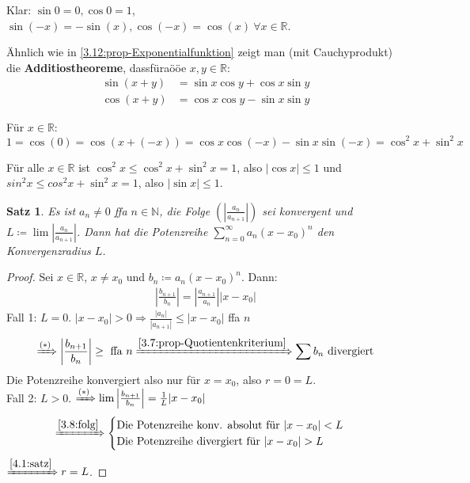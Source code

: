 \documentclass[12pt]{extreport} %
\newcommand{\N}{\mathbb{N}}
\newcommand{\R}{\mathbb{R}}
\theoremstyle{named}
\theoremstyle{dotless}
\newtheorem{satz}[unnamedtheorem]{Satz}
\begin{document}
Klar: $\sin 0 = 0, \cos 0 = 1$, $\sin (-x) = - \sin(x), \cos(-x) = \cos(x) ~\forall x \in \R$.

Ähnlich wie in \ref{3.12:prop-Exponentialfunktion} zeigt man (mit Cauchyprodukt) die \textbf{Additiostheoreme}, dassfüraööe $x, y \in \R$:
\begin{align*}
	\sin(x+y) & = \sin x \cos y + \cos x \sin y \\
	\cos(x+y) & = \cos x \cos y - \sin x \sin y
\end{align*}

Für $x \in \R$:
	$$ 1 = \cos(0) = \cos( x + (-x) )= \cos x \cos(-x) - \sin x \sin(-x) = \cos^{2} x + \sin^{2} x $$

Für alle $x \in \R$ ist $\cos^{2} x \leq \cos^{2} x + \sin^{2} x = 1$, also $|\cos x | \leq 1$ und $sin^{2} x \leq cos^{2} x + \sin^{2} x = 1$, also $|\sin x | \leq 1$.


\begin{satz} \label{4.4:satz}
	Es ist $a_{n} \neq 0$ ffa $n \in \N$, die Folge $\left( \left| \frac{a_{n}}{a_{n+1}} \right| \right)$ sei konvergent und $L \coloneqq \lim \left| \frac{a_{n}}{a_{n+1}} \right|$. Dann hat die Potenzreihe $\sum_{n=0}^{\infty} a_{n} (x - x_{0})^{n}$ den Konvergenzradius $L$.
\end{satz}

\begin{proof}
	Sei $x \in \R$, $x \neq x_{0}$ und $b_{n} \coloneqq a_{n} (x - x_{0})^{n}$. Dann:
	\begin{align}
		 \left| \frac{b_{n+1}}{b_{n}} \right| = \left| \frac{a_{n+1}}{a_{n}} \right| |x - x_{0}| \tag{$*$}
	\end{align}
	Fall 1: $L = 0$. $|x - x_{0}| > 0 \Rightarrow \frac{|a_{n}|}{|a_{n+1}|} \leq | x - x_{0}|$ ffa $n$
	$$ \xRightarrow[]{(*)} \left| \frac{b_{n+1}}{b_{n}} \right| \geq \text{ ffa } n \xRightarrow[]{\ref{3.7:prop-Quotientenkriterium}} \sum b_{n} \text{ divergiert} $$
	Die Potenzreihe konvergiert also nur für $x = x_{0}$, also $r = 0 = L$. \\
	Fall 2: $L > 0$. $\xRightarrow[]{(*)} \lim \left| \frac{b_{n+1}}{b_{n}} \right| = \frac{1}{L} |x - x_{0}|$
	$$ \xRightarrow[]{\ref{3.8:folg}} \begin{cases}
		\text{Die Potenzreihe konv. absolut für } |x - x_{0}| < L \\
		\text{Die Potenzreihe divergiert für } |x - x_{0}| > L
	\end{cases} $$
	$\xRightarrow[]{\ref{4.1:satz}} r = L$.
\end{proof}
\end{document}
